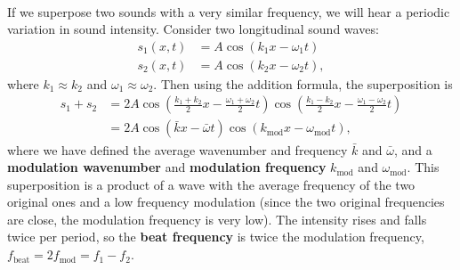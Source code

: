 \documentclass[../classical_mechanics.tex]{subfiles}
\begin{document}
        \paragraph{}
        If we superpose two sounds with a very similar frequency, we will hear a periodic variation in sound intensity.
        Consider two longitudinal sound waves:
        \begin{align}
            s_1(x,t)&=A\cos(k_1x-\omega_1t)\\
            s_2(x,t)&=A\cos(k_2x-\omega_2t),
        \end{align}
        where $k_1\approx k_2$ and $\omega_1\approx\omega_2$.
        Then using the addition formula, the superposition is
        \begin{align}
            s_1+s_2&=2A\cos\left(\frac{k_1+k_2}{2}x-\frac{\omega_1+\omega_2}{2}t\right)\cos\left(\frac{k_1-k_2}{2}x-\frac{\omega_1-\omega_2}{2}t\right)\\
            &=2A\cos(\bar{k}x-\bar{\omega}t)\cos(k_\text{mod}x-\omega_\text{mod}t),
        \end{align}
        where we have defined the average wavenumber and frequency $\bar{k}$ and $\bar{\omega}$, and a \textbf{modulation wavenumber} and \textbf{modulation frequency} $k_\text{mod}$ and $\omega_\text{mod}$.
        This superposition is a product of a wave with the average frequency of the two original ones and a low frequency modulation (since the two original frequencies are close, the modulation frequency is very low).
        The intensity rises and falls twice per period, so the \textbf{beat frequency} is twice the modulation frequency, $f_\text{beat}=2f_\text{mod}=f_1-f_2$.
\end{document}
